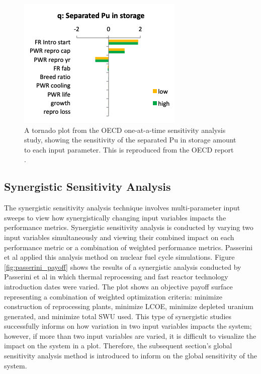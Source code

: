 \begin{figure}[]
	\begin{center}
		\includegraphics[scale=1]{./figures/oecd-tornado.png}
	\end{center}	
		\caption{A tornado plot from the OECD one-at-a-time sensitivity analysis 
        study, showing the sensitivity of the separated Pu in 
        storage amount to each input parameter. This is 
        reproduced from the OECD report \cite{noauthor_effects_2017}.}
	\label{fig:oecd-tornado}
\end{figure}

\subsection{Synergistic Sensitivity Analysis}
The synergistic sensitivity analysis technique involves multi-parameter 
input sweeps to view how synergistically changing input variables 
impacts the performance metrics.  
Synergistic sensitivity analysis is conducted by varying 
two input variables simultaneously and viewing their 
combined impact on each performance metric or a combination 
of weighted performance metrics. 
Passerini et al \cite{passerini_systematic_2014} applied
this analysis method on nuclear fuel cycle simulations. 
Figure \ref{fig:passerini_payoff} shows the results of a synergistic analysis 
conducted by Passerini et al \cite{passerini_systematic_2014} 
in which thermal reprocessing and fast reactor technology 
introduction dates were varied. 
The plot shows an objective payoff surface representing a combination of 
weighted optimization criteria: minimize construction of reprocessing plants, 
minimize \gls{LCOE}, minimize depleted uranium generated, and minimize total SWU used.
This type of synergistic studies successfully informs on how variation in 
two input variables impacts the system; however, if more than two input variables 
are varied, it is difficult to visualize the impact on the system in a plot. 
Therefore, the subsequent section's global sensitivity analysis method is introduced to 
inform on the global sensitivity of the system. 

